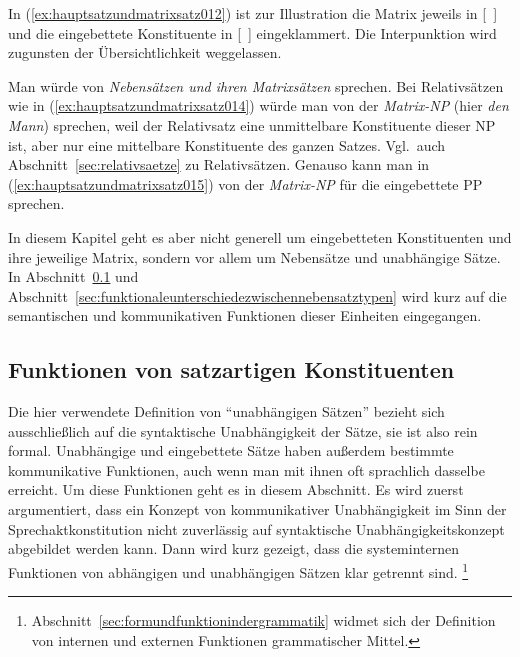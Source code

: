 In (\ref{ex:hauptsatzundmatrixsatz012}) ist zur Illustration die Matrix jeweils in [~] und die eingebettete Konstituente in [~] eingeklammert.
Die Interpunktion wird zugunsten der Übersichtlichkeit weggelassen.

\begin{exe}
  \ex\label{ex:hauptsatzundmatrixsatz012}
  \begin{xlist}
  \end{xlist}
\end{exe}

Man würde von \textit{Nebensätzen und ihren Matrixsätzen} sprechen.
Bei Relativsätzen wie in (\ref{ex:hauptsatzundmatrixsatz014}) würde man von der \textit{Matrix-NP} (hier \textit{den Mann}) sprechen, weil der Relativsatz eine unmittelbare Konstituente dieser NP ist, aber nur eine mittelbare Konstituente des ganzen Satzes.
Vgl.\ auch Abschnitt~\ref{sec:relativsaetze} zu Relativsätzen.
Genauso kann man in (\ref{ex:hauptsatzundmatrixsatz015}) von der \textit{Matrix-NP} für die eingebettete PP sprechen.

\begin{exe}
\end{exe}

In diesem Kapitel geht es aber nicht generell um eingebetteten Konstituenten und ihre jeweilige Matrix, sondern vor allem um Nebensätze und unabhängige Sätze.
In Abschnitt~\ref{sec:funktionenvonsatzartigenkonstituenten} und Abschnitt~\ref{sec:funktionaleunterschiedezwischennebensatztypen} wird kurz auf die semantischen und kommunikativen Funktionen dieser Einheiten eingegangen.


\subsection{Funktionen von satzartigen Konstituenten}
\label{sec:funktionenvonsatzartigenkonstituenten}

Die hier verwendete Definition von "`unabhängigen Sätzen"' bezieht sich ausschließlich auf die syntaktische Unabhängigkeit der Sätze, sie ist also rein formal.
Unabhängige und eingebettete Sätze haben außerdem bestimmte kommunikative Funktionen, auch wenn man mit ihnen oft sprachlich dasselbe erreicht.
Um diese Funktionen geht es in diesem Abschnitt.
Es wird zuerst argumentiert, dass ein Konzept von kommunikativer Unabhängigkeit im Sinn der Sprechaktkonstitution nicht zuverlässig auf syntaktische Unabhängigkeitskonzept abgebildet werden kann.
Dann wird kurz gezeigt, dass die systeminternen Funktionen von abhängigen und unabhängigen Sätzen klar getrennt sind.%
\footnote{Abschnitt~\ref{sec:formundfunktionindergrammatik} widmet sich der Definition von internen und externen Funktionen grammatischer Mittel.}


